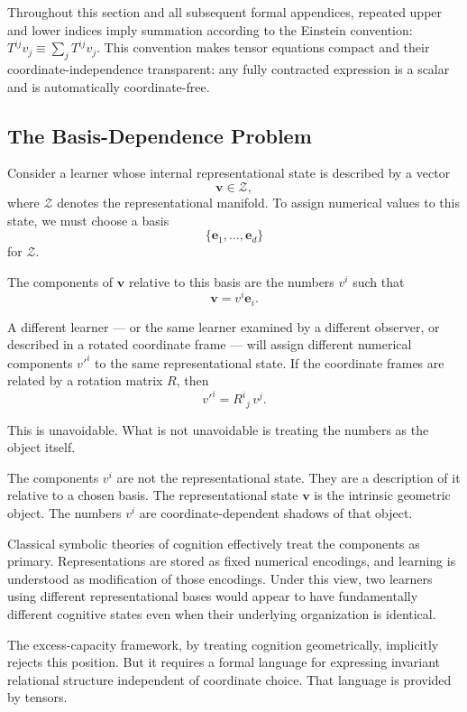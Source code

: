 \documentclass[12pt,a4paper]{article}
\begin{document}
Throughout this section and all subsequent formal appendices, repeated upper and lower indices imply summation according to the Einstein convention: $T^{ij} v_j \equiv \sum_j T^{ij} v_j$. This convention makes tensor equations compact and their coordinate-independence transparent: any fully contracted expression is a scalar and is automatically coordinate-free.

\subsection{The Basis-Dependence Problem}

Consider a learner whose internal representational state is described by a vector
\[
\mathbf{v} \in \mathcal{Z},
\]
where $\mathcal{Z}$ denotes the representational manifold. To assign numerical values to this state, we must choose a basis
\[
\{\mathbf{e}_1, \ldots, \mathbf{e}_d\}
\]
for $\mathcal{Z}$.

The components of $\mathbf{v}$ relative to this basis are the numbers $v^i$ such that
\[
\mathbf{v} = v^i \mathbf{e}_i.
\]

A different learner --- or the same learner examined by a different observer, or described in a rotated coordinate frame --- will assign different numerical components $v'^i$ to the same representational state. If the coordinate frames are related by a rotation matrix $R$, then
\[
v'^i = R^i{}_j \, v^j.
\]

This is unavoidable. What is not unavoidable is treating the numbers as the object itself.

The components $v^i$ are not the representational state. They are a description of it relative to a chosen basis. The representational state $\mathbf{v}$ is the intrinsic geometric object. The numbers $v^i$ are coordinate-dependent shadows of that object.

Classical symbolic theories of cognition effectively treat the components as primary. Representations are stored as fixed numerical encodings, and learning is understood as modification of those encodings. Under this view, two learners using different representational bases would appear to have fundamentally different cognitive states even when their underlying organization is identical.

The excess-capacity framework, by treating cognition geometrically, implicitly rejects this position. But it requires a formal language for expressing invariant relational structure independent of coordinate choice. That language is provided by tensors.
\end{document}
